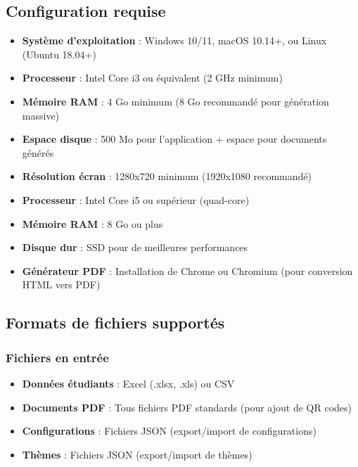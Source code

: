 \subsection{Configuration requise}

\begin{tcolorbox}[colback=blue!5!white,colframe=blue!75!black,title=Configuration système minimale]
\begin{itemize}[leftmargin=*]
    \item \textbf{Système d'exploitation} : Windows 10/11, macOS 10.14+, ou Linux (Ubuntu 18.04+)
    \item \textbf{Processeur} : Intel Core i3 ou équivalent (2 GHz minimum)
    \item \textbf{Mémoire RAM} : 4 Go minimum (8 Go recommandé pour génération massive)
    \item \textbf{Espace disque} : 500 Mo pour l'application + espace pour documents générés
    \item \textbf{Résolution écran} : 1280x720 minimum (1920x1080 recommandé)
\end{itemize}
\end{tcolorbox}

\begin{tcolorbox}[colback=green!5!white,colframe=green!75!black,title=Configuration recommandée pour usage intensif]
\begin{itemize}[leftmargin=*]
    \item \textbf{Processeur} : Intel Core i5 ou supérieur (quad-core)
    \item \textbf{Mémoire RAM} : 8 Go ou plus
    \item \textbf{Disque dur} : SSD pour de meilleures performances
    \item \textbf{Générateur PDF} : Installation de Chrome ou Chromium (pour conversion HTML vers PDF)
\end{itemize}
\end{tcolorbox}

\subsection{Formats de fichiers supportés}

\subsubsection{Fichiers en entrée}

\begin{itemize}[leftmargin=*]
    \item \textbf{Données étudiants} : Excel (.xlsx, .xls) ou CSV
    \item \textbf{Documents PDF} : Tous fichiers PDF standards (pour ajout de QR codes)
    \item \textbf{Configurations} : Fichiers JSON (export/import de configurations)
    \item \textbf{Thèmes} : Fichiers JSON (export/import de thèmes)
\end{itemize}

